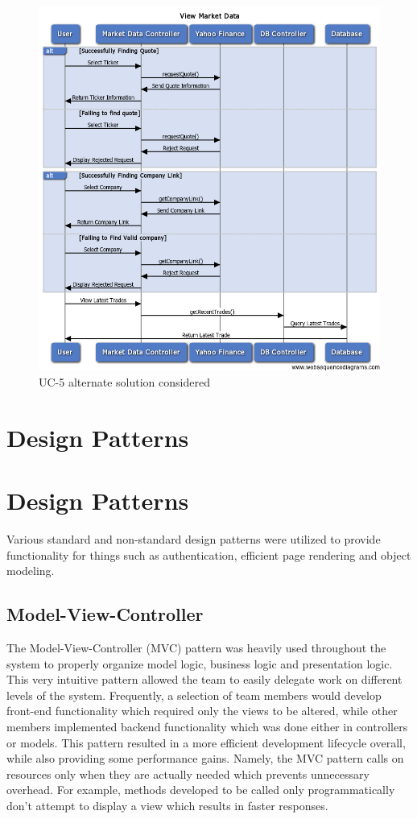\begin{figure}[H]
\centering
\includegraphics[width=5.5in]{./img/inter/alt5.png}
\caption{UC-5 alternate solution considered}
\end{figure}

\section{Design Patterns}

\section{Design Patterns}
Various standard and non-standard design patterns were utilized to provide
functionality for things such as authentication, efficient page rendering and
object modeling.

\subsection{Model-View-Controller}
The Model-View-Controller (MVC) pattern was heavily used throughout the system
to properly organize model logic, business logic and presentation logic. This
very intuitive pattern allowed the team to easily delegate work on different
levels of the system. Frequently, a selection of team members would develop
front-end functionality which required only the views to be altered, while other
members implemented backend functionality which was done either in controllers
or models. This pattern resulted in a more efficient development lifecycle
overall, while also providing some performance gains. Namely, the MVC pattern
calls on resources only when they are actually needed which prevents unnecessary
overhead. For example, methods developed to be called only programmatically
don't attempt to display a view which results in faster responses.
